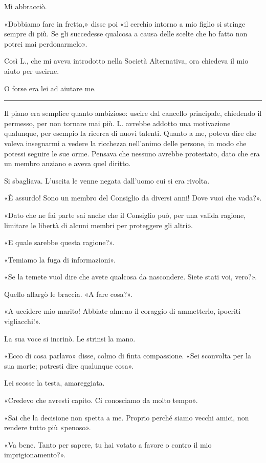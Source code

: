 Mi abbracciò.

«Dobbiamo fare in fretta,» disse poi «il cerchio intorno a mio figlio si stringe sempre di più. Se
gli succedesse qualcosa a causa delle scelte che ho fatto non potrei mai perdonarmelo».

Così L., che mi aveva introdotto nella Società Alternativa, ora chiedeva il mio aiuto per uscirne.

O forse era lei ad aiutare me.

\plainbreak{1}

Il piano era semplice quanto ambizioso: uscire dal cancello principale, chiedendo il permesso, per
non tornare mai più. L. avrebbe addotto una motivazione qualunque, per esempio la ricerca di nuovi
talenti. Quanto a me, poteva dire che voleva insegnarmi a vedere la ricchezza nell'animo delle
persone, in modo che potessi seguire le sue orme. Pensava che nessuno avrebbe protestato, dato che
era un membro anziano e aveva quel diritto.

Si sbagliava. L'uscita le venne negata dall'uomo cui si era rivolta.

«È assurdo! Sono un membro del Consiglio da diversi anni! Dove vuoi che vada?».

«Dato che ne fai parte sai anche che il Consiglio può, per una valida ragione, limitare le libertà
di alcuni membri per proteggere gli altri».

«E quale sarebbe questa ragione?».

«Temiamo la fuga di informazioni».

«Se la temete vuol dire che avete qualcosa da nascondere. Siete stati voi, vero?».

Quello allargò le braccia. «A fare cosa?».

«A uccidere mio marito! Abbiate almeno il coraggio di ammetterlo, ipocriti vigliacchi!».

La sua voce si incrinò. Le strinsi la mano.

«Ecco di cosa parlavo» disse, colmo di finta compassione. «Sei sconvolta per la sua morte; potresti
dire qualunque cosa».

Lei scosse la testa, amareggiata.

«Credevo che avresti capito. Ci conosciamo da molto tempo».

«Sai che la decisione non spetta a me. Proprio perché siamo vecchi amici, non rendere tutto più
«penoso».

«Va bene. Tanto per sapere, tu hai votato a favore o contro il mio imprigionamento?».

